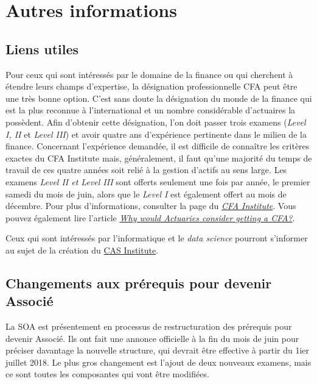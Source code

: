 \section*{Autres informations}
\label{sec:autres}

\subsection*{Liens utiles}
\label{subsec:liens}
Pour ceux qui sont intéressés par le domaine de la finance ou qui cherchent à étendre leurs champs d'expertise, la désignation professionnelle CFA peut être une très bonne option. C'est sans doute la désignation du monde de la finance qui est la plus reconnue à l'international et un nombre considérable d'actuaires la possèdent. Afin d'obtenir cette désignation, l'on doit passer trois examens (\emph{Level I, II} et \emph{Level III}) et avoir quatre ans d'expérience pertinente dans le milieu de la finance. Concernant l'expérience demandée, il est difficile de connaître les critères exactes du CFA Institute mais, généralement, il faut qu'une majorité du temps de travail de ces quatre années soit relié à la gestion d'actifs au sens large. Les examens \emph{Level II \emph{et} Level III} sont offerts seulement une fois par année, le premier samedi du mois de juin, alors que le \emph{Level I} est également offert au mois de décembre. Pour plus d'informations, consulter la page du \href{https://www.cfainstitute.org/Pages/index.aspx}{\emph{CFA Institute}}. Vous pouvez également lire l'article \href{http://blog.coachingactuaries.com/why-would-actuaries-consider-getting-a-cfa/}{\emph{Why would Actuaries consider getting a CFA?}}.\vspace{\baselineskip}

Ceux qui sont intéressés par l'informatique et le \emph{data science} pourront s'informer au sujet de la création du \href{http://www.casact.org/press/index.cfm?fa=viewArticle&articleID=3083}{CAS Institute}.\vspace{\baselineskip} 

\newpage
\subsection*{Changements aux prérequis pour devenir Associé}
\label{subsec:changeasa}
La SOA est présentement en processus de restructuration des prérequis pour devenir Associé. Ils ont fait une annonce officielle à la fin du mois de juin pour préciser davantage la nouvelle structure, qui devrait être effective à partir du 1ier juillet 2018. Le plus gros changement est l’ajout de deux nouveaux examens, mais ce sont toutes les composantes qui vont être modifiées.\vspace{\baselineskip} 

